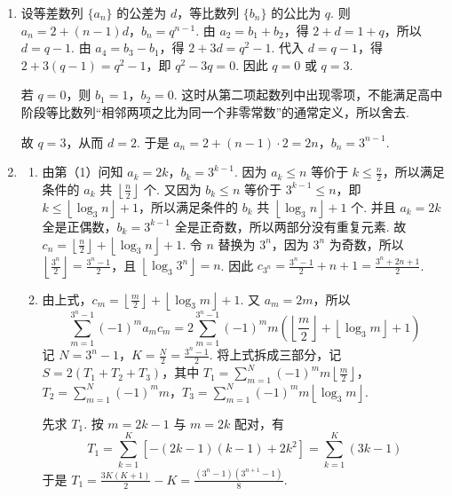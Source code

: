 \begin{solution}
\begin{enumerate}
\item 设等差数列 \(\{a_n\}\) 的公差为 \(d\)，等比数列 \(\{b_n\}\) 的公比为 \(q\). 则 \(a_n=2+\left( n-1 \right)d\)，\(b_n=q^{n-1}\).
由 \(a_2=b_1+b_2\)，得 \(2+d=1+q\)，所以 \(d=q-1\). 由 \(a_4=b_3-b_1\)，得 \(2+3d=q^2-1\). 代入 \(d=q-1\)，得 \(2+3\left( q-1 \right)=q^2-1\)，即 \(q^2-3q=0\). 因此 \(q=0\) 或 \(q=3\).

若 \(q=0\)，则 \(b_1=1\)，\(b_2=0\). 这时从第二项起数列中出现零项，不能满足高中阶段等比数列“相邻两项之比为同一个非零常数”的通常定义，所以舍去.

故 \(q=3\)，从而 \(d=2\). 于是 \(a_n=2+\left( n-1 \right)\cdot 2=2n\)，\(b_n=3^{n-1}\).

\item
\begin{enumerate}
\item 由第（1）问知 \(a_k=2k\)，\(b_k=3^{k-1}\).
因为 \(a_k\le n\) 等价于 \(k\le \frac{n}{2}\)，所以满足条件的 \(a_k\) 共 \(\left\lfloor \frac{n}{2} \right\rfloor\) 个.
又因为 \(b_k\le n\) 等价于 \(3^{k-1}\le n\)，即 \(k\le \left\lfloor \log_3 n \right\rfloor +1\)，所以满足条件的 \(b_k\) 共 \(\left\lfloor \log_3 n \right\rfloor +1\) 个.
并且 \(a_k=2k\) 全是正偶数，\(b_k=3^{k-1}\) 全是正奇数，所以两部分没有重复元素. 故 \(c_n=\left\lfloor \frac{n}{2} \right\rfloor +\left\lfloor \log_3 n \right\rfloor +1\).
令 \(n\) 替换为 \(3^n\)，因为 \(3^n\) 为奇数，所以 \(\left\lfloor \frac{3^n}{2} \right\rfloor =\frac{3^n-1}{2}\)，且 \(\left\lfloor \log_3 3^n \right\rfloor =n\). 因此 \(c_{3^n}=\frac{3^n-1}{2}+n+1=\frac{3^n+2n+1}{2}\).

\item 由上式，\(c_m=\left\lfloor \frac{m}{2} \right\rfloor +\left\lfloor \log_3 m \right\rfloor +1\). 又 \(a_m=2m\)，所以
\[
\sum_{m=1}^{3^n-1}\left( -1 \right)^m a_m c_m
=2\sum_{m=1}^{3^n-1}\left( -1 \right)^m m\left( \left\lfloor \frac{m}{2} \right\rfloor +\left\lfloor \log_3 m \right\rfloor +1 \right)
\]
记 \(N=3^n-1\)，\(K=\frac{N}{2}=\frac{3^n-1}{2}\). 将上式拆成三部分，记 \(S=2\left( T_1+T_2+T_3 \right)\)，其中 \(T_1=\sum_{m=1}^{N}\left( -1 \right)^m m\left\lfloor \frac{m}{2} \right\rfloor\)，\(T_2=\sum_{m=1}^{N}\left( -1 \right)^m m\)，\(T_3=\sum_{m=1}^{N}\left( -1 \right)^m m\left\lfloor \log_3 m \right\rfloor\).

先求 \(T_1\). 按 \(m=2k-1\) 与 \(m=2k\) 配对，有
\[
T_1=\sum_{k=1}^{K}\left[ -\left( 2k-1 \right)\left( k-1 \right)+2k^2 \right]
=\sum_{k=1}^{K}\left( 3k-1 \right)
\]
于是 \(T_1=\frac{3K\left( K+1 \right)}{2}-K=\frac{\left( 3^n-1 \right)\left( 3^{n+1}-1 \right)}{8}\).


\end{enumerate}
\end{enumerate}
\end{solution}
